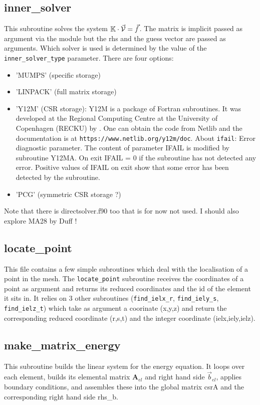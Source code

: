  \subsection{inner\_solver}
 This subroutine solves the system ${\mathbb{K}}\cdot \vec{\cal V} = \vec{f}$. The matrix is 
 implicit passed as argument via the module but the rhs and the guess vector are 
 passed as arguments.
 Which solver is used is determined by the value of the {\tt inner\_solver\_type} parameter.
 There are four options:
 \begin{itemize}
 \item 'MUMPS' (specific storage)
 \item 'LINPACK' (full matrix storage)
 \item 'Y12M' (CSR storage): Y12M is a package of Fortran subroutines. It was developed at
 the Regional Computing Centre at the University of Copenhagen (RECKU) by \textcite{zlws81}. One
 can obtain the code from Netlib and the documentation is at {\tt https://www.netlib.org/y12m/doc}.
 About {\tt ifail}: Error diagnostic parameter. The content of parameter IFAIL is modified  
 by subroutine Y12MA.  On exit IFAIL = 0 if the subroutine has not detected any error.  
 Positive  values  of IFAIL on  exit  show  that some error has been
 detected by the subroutine. 
 \item 'PCG' (symmetric CSR storage ?)
 \end{itemize}
 Note that there is directsolver.f90 too that is for now not used.
 I should also explore MA28 by Duff ! 
 \subsection{locate\_point}
 This file contains a few simple subroutines which deal with the localisation of a point 
 in the mesh. The {\tt locate\_point} subroutine receives the coordinates of a point as argument 
 and returns its reduced coordinates and the id of the element it sits in.
 It relies on 3 other subroutines ({\tt find\_ielx\_r}, {\tt find\_iely\_s}, {\tt find\_ielz\_t})
 which take as argument a coorinate (x,y,z) and return the corresponding reduced
 coordinate (r,s,t) and the integer coordinate (ielx,iely,ielz).
 \subsection{make\_matrix\_energy}
 This subroutine builds the linear system for the energy equation. 
 It loops over each element, builds its elemental matrix ${\bm A}_{el}$
 and right hand side $\vec{b}_{el}$, applies boundary conditions, 
 and assembles these into the global matrix csrA and the corresponding 
 right hand side rhs\_b. 
